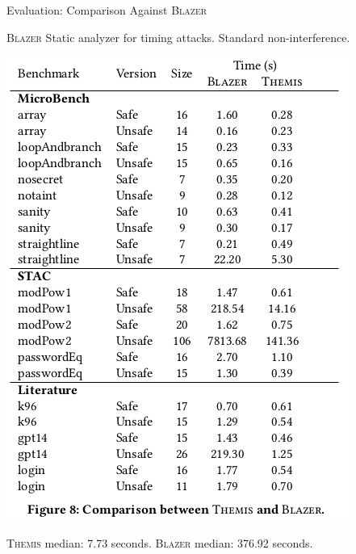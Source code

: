 \documentclass[page number]{beamer}
\begin{document}
\begin{frame}{Evaluation: Comparison Against \textsc{Blazer}}
  \begin{block}{\textsc{Blazer}}
    Static analyzer for timing attacks. Standard non-interference.
  \end{block}
  \vfill
\begin{center}
    \includegraphics[scale=0.28]{img_chen/8.png}
  \end{center}
  \vfill
  \textsc{Themis} median: 7.73 seconds. \textsc{Blazer} median: 376.92 seconds.
\end{frame}
\end{document}
